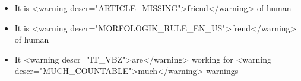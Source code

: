\documentclass[11pt]{article}
\begin{document}
    \begin{itemize}
        \item It is <warning descr="ARTICLE_MISSING">friend</warning> of human
        \item It is <warning descr="MORFOLOGIK_RULE_EN_US">frend</warning> of human
        \item It <warning descr="IT_VBZ">are</warning> working for <warning descr="MUCH_COUNTABLE">much</warning> warnings
    \end{itemize}
\end{document}
